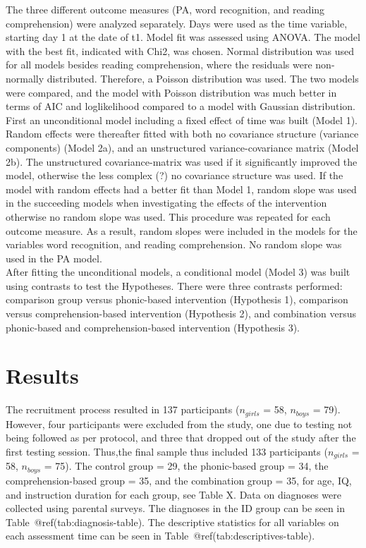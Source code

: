 \documentclass[
]{article}
\begin{document}
The three different outcome measures (PA, word recognition, and reading
comprehension) were analyzed separately. Days were used as the time
variable, starting day 1 at the date of t1. Model fit was assessed using
ANOVA. The model with the best fit, indicated with Chi2, was chosen.
Normal distribution was used for all models besides reading
comprehension, where the residuals were non-normally distributed.
Therefore, a Poisson distribution was used. The two models were
compared, and the model with Poisson distribution was much better in
terms of AIC and loglikelihood compared to a model with Gaussian
distribution. First an unconditional model including a fixed effect of
time was built (Model 1). Random effects were thereafter fitted with
both no covariance structure (variance components) (Model 2a), and an
unstructured variance-covariance matrix (Model 2b). The unstructured
covariance-matrix was used if it significantly improved the model,
otherwise the less complex (?) no covariance structure was used. If the
model with random effects had a better fit than Model 1, random slope
was used in the succeeding models when investigating the effects of the
intervention otherwise no random slope was used. This procedure was
repeated for each outcome measure. As a result, random slopes were
included in the models for the variables word recognition, and reading
comprehension. No random slope was used in the PA model.\\
After fitting the unconditional models, a conditional model (Model 3)
was built using contrasts to test the Hypotheses. There were three
contrasts performed: comparison group versus phonic-based intervention
(Hypothesis 1), comparison versus comprehension-based intervention
(Hypothesis 2), and combination versus phonic-based and
comprehension-based intervention (Hypothesis 3).

\hypertarget{results}{%
\section{Results}\label{results}}

The recruitment process resulted in 137 participants (\(n_{girls}\) =
58, \(n_{boys}\) = 79). However, four participants were excluded from
the study, one due to testing not being followed as per protocol, and
three that dropped out of the study after the first testing session.
Thus,the final sample thus included 133 participants (\(n_{girls}\) =
58, \(n_{boys}\) = 75). The control group = 29, the phonic-based group =
34, the comprehension-based group = 35, and the combination group = 35,
for age, IQ, and instruction duration for each group, see Table X. Data
on diagnoses were collected using parental surveys. The diagnoses in the
ID group can be seen in Table~@ref(tab:diagnosis-table). The descriptive
statistics for all variables on each assessment time can be seen in
Table~@ref(tab:descriptives-table).
\end{document}
